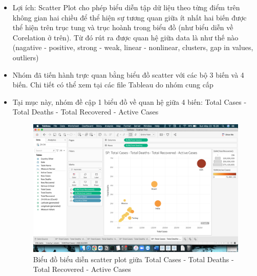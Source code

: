 \documentclass[a4paper, 12pt]{article}
\begin{document}
\begin{itemize}
    \item Lợi ích: Scatter Plot cho phép biểu diễn tập dữ liệu theo từng điểm trên không gian hai chiều để thể hiện sự tương quan giữa ít nhất hai biến được thể hiện trên trục tung và trục hoành trong biểu đồ (như biểu diễn về Corelation ở trên). Từ đó rút ra được quan hệ giữa data là như thế nào (nagative - positive, strong - weak, linear - nonlinear, clusters, gap in values, outliers)
    \item Nhóm đã tiến hành trực quan bằng biểu đồ scatter với các bộ 3 biến và 4 biến. Chi tiết có thể xem tại các file Tableau do nhóm cung cấp
    \item Tại mục này, nhóm đề cập 1 biểu đồ về quan hệ giữa 4 biến: Total Cases - Total Deaths - Total Recovered - Active Cases
    \begin{figure}[H]
        \begin{center}
            \includegraphics[scale=0.4]{img/scatter4Vars.png}
            \caption{Biểu đồ biểu diễn scatter plot giữa Total Cases - Total Deaths - Total Recovered - Active Cases}
        \end{center}
    \end{figure}


\end{itemize}
\end{document}
